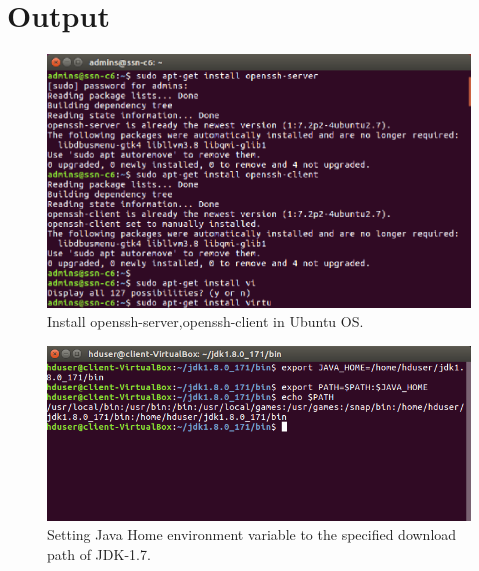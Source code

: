 \documentclass[a4paper,10pt]{article}
\begin{document}
\section{Output}
\begin{figure}[h]
	\includegraphics[scale=0.30,center]{exptTwoScreenShot/fig1.png}
	\caption{Install openssh-server,openssh-client in Ubuntu OS.}
	\label{fig:1}
	
\end{figure}
\begin{figure}[h]
	\includegraphics[scale=0.34,center]{exptTwoScreenShot/fig2.png}
	\caption{Setting Java Home environment variable to the specified download path of JDK-1.7.}
	\label{fig:2}
\end{figure}
\end{document}
